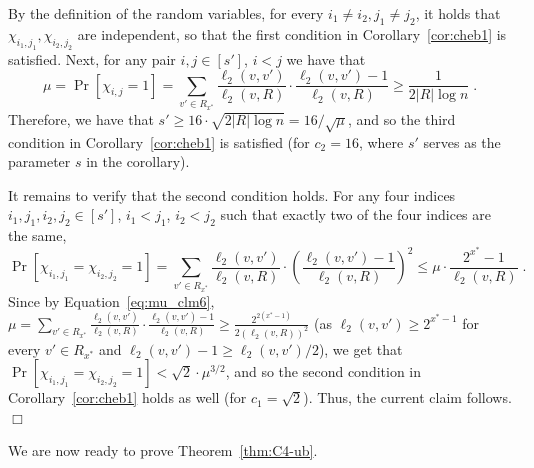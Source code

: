 \documentclass{article}
\newenvironment{proof}{\smallskip\noindent{\bf Proof:}}%
        {\hspace*{\fill}$\Box$\par}
\begin{document}
\begin{proof}
 By the definition of the random variables, for every $i_1\neq i_2, j_1\neq j_2$, it holds that $\chi_{i_1,j_1}, \chi_{i_2, j_2}$ are independent,  so that 
the first condition in Corollary~\ref{cor:cheb1} is satisfied. Next, for any pair $i,j\in [s']$, $i<j$ we have that
\begin{equation} \label{eq:mu_clm6}
\mu = \Pr[\chi_{i,j}=1] = \sum_{v'\in R_{x^*}} \frac{\ell_2(v,v')}{\ell_2(v,R)}\cdot   \frac{\ell_2(v,v')-1}{\ell_2(v,R)} \geq \frac{1}{2|R|\log n}\;.
\end{equation}
Therefore, we have that  $s' \geq 16\cdot\sqrt{2|R|\log n}=16/\sqrt{\mu}$, and so  
the third condition in Corollary~\ref{cor:cheb1}
is satisfied (for $c_2=16$, where $s'$ serves as the parameter $s$ in the corollary).  

It remains to verify that the second condition holds. For any four indices $i_1,j_1,i_2,j_2\in [s']$, $i_1 < j_1$, $i_2 < j_2$ such that exactly two of the four indices are the same,
\begin{equation}
\Pr[\chi_{i_1,j_1}=\chi_{i_2,j_2} = 1] = \sum_{v'\in R_{x^*}} \frac{\ell_2(v,v')}{\ell_2(v,R)}\cdot   \left(\frac{\ell_2(v,v')-1}{\ell_2(v,R)}\right)^2 \leq \mu\cdot \frac{2^{x^*}-1}{\ell_2(v,R)} \;.
\end{equation}
Since by Equation~\eqref{eq:mu_clm6}, $\mu = \sum_{v'\in R_{x^*}} \frac{\ell_2(v,v')}{\ell_2(v,R)}\cdot   \frac{\ell_2(v,v')-1}{\ell_2(v,R)} \geq \frac{2^{2(x^*-1)}}{2(\ell_2(v,R))^2}$ (as $\ell_2(v,v') \geq 2^{x^*-1}$ for every $v'\in R_{x^*}$  and $\ell_2(v,v') - 1 \geq \ell_2(v,v')/2$), 
we get that $\Pr[\chi_{i_1,j_1}=\chi_{i_2,j_2} = 1]<\sqrt 2 \cdot \mu^{3/2}$, and so
the second condition in Corollary~\ref{cor:cheb1} holds as well (for $c_1=\sqrt 2$).
Thus, the current claim follows. 
\end{proof}





\medskip
We are now ready to prove Theorem~\ref{thm:C4-ub}.
\end{document}
